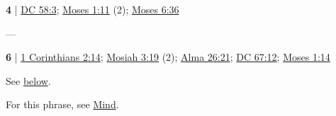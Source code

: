 	\begin{compactdesc}
	
		\item[natural eye] \textbf{4} | \hyperref[DC58-3]{DC 58:3}; \hyperref[MOSES-1-11]{Moses 1:11} (2); \hyperref[MOSES-6-36]{Moses 6:36}
			\begin{compactdesc}
				\item[Bible anchor verses] ---
			\end{compactdesc}
	
		\item[natural man] \textbf{6} | \hyperref[1CORINTHIANS-2-14]{1 Corinthians 2:14}; \hyperref[MOSIAH-3-19]{Mosiah 3:19} (2); \hyperref[ALMA-26-21]{Alma 26:21}; \hyperref[DC67-12]{DC 67:12}; \hyperref[MOSES-1-14]{Moses 1:14}
			\begin{compactdesc}
				\item[Bible anchor verses] \phantom{.}
					\begin{compactdesc}
						\item[1 Corinthians 2:14] \hyperref[PSUCHIKOS]{} 
					\end{compactdesc}
				\item[Commentary] See \hyperref[NATURAL-man]{below}.
			\end{compactdesc}
			
		\item[natural mind] For this phrase, see \hyperref[MIND-PHRASES]{Mind}.
			
			
	\end{compactdesc}
	
